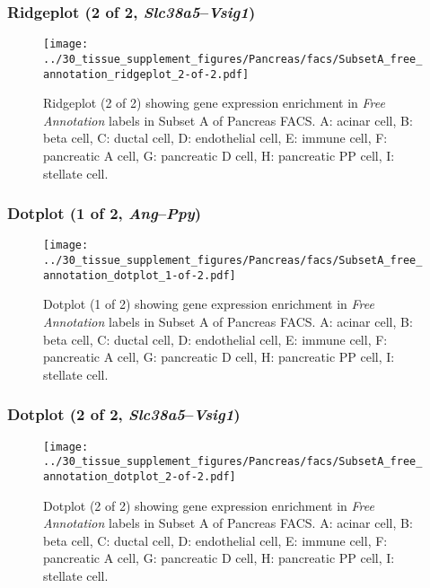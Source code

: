 \clearpage

\subsubsection{Ridgeplot (2 of 2, \emph{Slc38a5}--\emph{Vsig1})}
\begin{figure}[h]
\centering
\texttt{[image: ../30\_tissue\_supplement\_figures/Pancreas/facs/SubsetA\_free\_annotation\_ridgeplot\_2-of-2.pdf]}

\caption{ Ridgeplot (2 of 2)  showing gene expression enrichment in \emph{Free Annotation} labels in Subset A of Pancreas FACS. A: acinar cell, B: beta cell, C: ductal cell, D: endothelial cell, E: immune cell, F: pancreatic A cell, G: pancreatic D cell, H: pancreatic PP cell, I: stellate cell.}
\end{figure}


\clearpage

\subsubsection{Dotplot (1 of 2, \emph{Ang}--\emph{Ppy})}
\begin{figure}[h]
\centering
\texttt{[image: ../30\_tissue\_supplement\_figures/Pancreas/facs/SubsetA\_free\_annotation\_dotplot\_1-of-2.pdf]}

\caption{ Dotplot (1 of 2)  showing gene expression enrichment in \emph{Free Annotation} labels in Subset A of Pancreas FACS. A: acinar cell, B: beta cell, C: ductal cell, D: endothelial cell, E: immune cell, F: pancreatic A cell, G: pancreatic D cell, H: pancreatic PP cell, I: stellate cell.}
\end{figure}


\clearpage

\subsubsection{Dotplot (2 of 2, \emph{Slc38a5}--\emph{Vsig1})}
\begin{figure}[h]
\centering
\texttt{[image: ../30\_tissue\_supplement\_figures/Pancreas/facs/SubsetA\_free\_annotation\_dotplot\_2-of-2.pdf]}

\caption{ Dotplot (2 of 2)  showing gene expression enrichment in \emph{Free Annotation} labels in Subset A of Pancreas FACS. A: acinar cell, B: beta cell, C: ductal cell, D: endothelial cell, E: immune cell, F: pancreatic A cell, G: pancreatic D cell, H: pancreatic PP cell, I: stellate cell.}
\end{figure}

